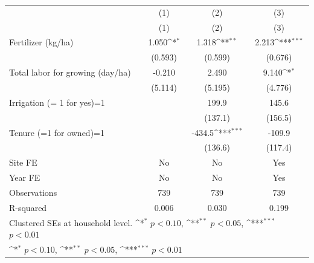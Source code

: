 {
\def\sym#1{\ifmmode^{#1}\else\(^{#1}\)\fi}
\begin{tabular}{l*{3}{c}}
\toprule
                    &\multicolumn{1}{c}{(1)}&\multicolumn{1}{c}{(2)}&\multicolumn{1}{c}{(3)}\\
                    &\multicolumn{1}{c}{(1)}&\multicolumn{1}{c}{(2)}&\multicolumn{1}{c}{(3)}\\
\midrule
Fertilizer (kg/ha)  &       1.050\sym{*}  &       1.318\sym{**} &       2.213\sym{***}\\
                    &     (0.593)         &     (0.599)         &     (0.676)         \\
\addlinespace
Total labor for growing (day/ha)&      -0.210         &       2.490         &       9.140\sym{*}  \\
                    &     (5.114)         &     (5.195)         &     (4.776)         \\
\addlinespace
Irrigation (= 1 for yes)=1&                     &       199.9         &       145.6         \\
                    &                     &     (137.1)         &     (156.5)         \\
\addlinespace
Tenure (=1 for owned)=1&                     &      -434.5\sym{***}&      -109.9         \\
                    &                     &     (136.6)         &     (117.4)         \\
\addlinespace
Site FE             &          No         &          No         &         Yes         \\
\addlinespace
Year FE             &          No         &          No         &         Yes         \\
\midrule
Observations        &         739         &         739         &         739         \\
R-squared           &       0.006         &       0.030         &       0.199         \\
\bottomrule
\multicolumn{4}{l}{\footnotesize Clustered SEs at household level. \sym{*} \(p<0.10\), \sym{**} \(p<0.05\), \sym{***} \(p<0.01\)}\\
\multicolumn{4}{l}{\footnotesize \sym{*} \(p<0.10\), \sym{**} \(p<0.05\), \sym{***} \(p<0.01\)}\\
\end{tabular}
}
